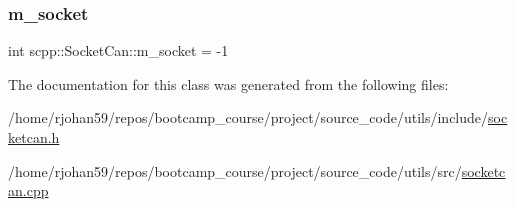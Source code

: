 \subsubsection{\texorpdfstring{m\+\_\+socket}{m\_socket}}
{\footnotesize\ttfamily int scpp\+::\+Socket\+Can\+::m\+\_\+socket = -\/1\hspace{0.3cm}{\ttfamily [private]}}



The documentation for this class was generated from the following files\+:\begin{DoxyCompactItemize}
\item 
/home/rjohan59/repos/bootcamp\+\_\+course/project/source\+\_\+code/utils/include/\hyperlink{socketcan_8h}{socketcan.\+h}\item 
/home/rjohan59/repos/bootcamp\+\_\+course/project/source\+\_\+code/utils/src/\hyperlink{socketcan_8cpp}{socketcan.\+cpp}\end{DoxyCompactItemize}
